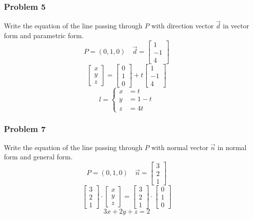\documentclass[letterpaper, 12pt]{math}
\begin{document}
\subsubsection*{Problem 5}
Write the equation of the line passing through \( P \) with direction vector
\( \vec{d} \) in vector form and parametric form.
\[ P = (0,1,0) \quad \vec{d} = \begin{bmatrix}1 \\ -1 \\ 4\end{bmatrix} \]
\[ \begin{bmatrix}x \\ y \\ z\end{bmatrix} =
  \begin{bmatrix}0 \\ 1 \\ 0\end{bmatrix}+
  t\begin{bmatrix}1 \\ -1 \\ 4\end{bmatrix} \]
\[ l = \begin{cases}
  x &= t \\
  y &= 1-t \\
  z &= 4t
\end{cases} \]

\subsubsection*{Problem 7}
Write the equation of the line passing through \( P \) with normal vector
\( \vec{n} \) in normal form and general form.
\[ P = (0,1,0) \quad \vec{n} = \begin{bmatrix}3 \\ 2 \\ 1\end{bmatrix} \]
\[ \begin{bmatrix}3 \\ 2 \\ 1\end{bmatrix}\cdot
  \begin{bmatrix}x \\ y \\ z\end{bmatrix} =
  \begin{bmatrix}3 \\ 2 \\ 1\end{bmatrix}\cdot
  \begin{bmatrix}0 \\ 1 \\ 0\end{bmatrix} \]
\[ 3x+2y+z = 2 \]
\end{document}
